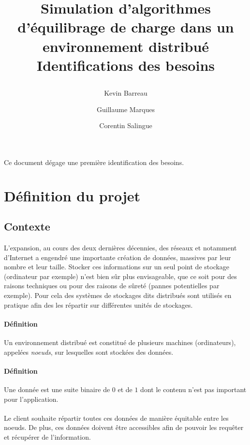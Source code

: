 \documentclass[12pt]{article}
\title{
 \begin{minipage}\linewidth
        \centering
        Simulation d'algorithmes d'équilibrage de charge dans un environnement distribué 
        \vskip3pt
        \large Identifications des besoins
    \end{minipage}
 }
\author{Kevin Barreau \and Guillaume Marques \and Corentin Salingue}
\begin{document}
\maketitle

\abstract
Ce document dégage une première identification des besoins.



\newpage


\renewcommand{\contentsname}{Sommaire} 
\tableofcontents



\newpage

\section{Définition du projet}

\subsection{Contexte}

\paragraph{} L'expansion, au cours des deux dernières décennies, des réseaux et notamment d'Internet a engendré une importante création de données, massives par leur nombre et leur taille.
Stocker ces informations sur un seul point de stockage (ordinateur par exemple) n'est bien sûr plus envisageable, que ce soit pour des raisons techniques ou pour des raisons de sûreté (pannes potentielles par exemple).
Pour cela des systèmes de stockages dits distribués sont utilisés en pratique afin des les répartir sur différentes unités de stockages.

\paragraph{Définition} Un environnement distribué est constitué de plusieurs machines (ordinateurs), appelées \textit{noeuds}, sur lesquelles sont stockées des données.

\paragraph{Définition} Une donnée est une suite binaire de $0$ et de $1$ dont le contenu n'est pas important pour l'application.

\paragraph{} Le client souhaite répartir toutes ces données de manière équitable entre les noeuds. De plus, ces données doivent être accessibles afin de pouvoir les requêter et récupérer de l'information.
\end{document}
